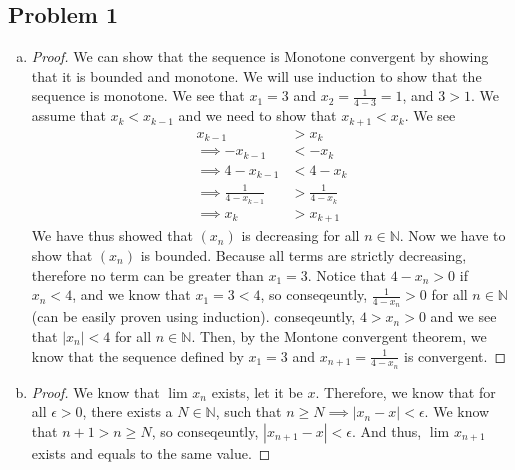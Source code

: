\documentclass[12pt]{article}
\begin{document}
\subsection*{Problem 1}
\begin{enumerate}[a).]
    \item {
        \begin{proof}
        We can show that the sequence is Monotone convergent by showing that it is bounded and monotone.
        We will use induction to show that the sequence is monotone. 
        We see that $x_1 = 3$ and $x_2 = \frac{1}{4 - 3} = 1$, and $3 > 1$. 
        We assume that $x_k < x_{k-1}$ and we need to show that $x_{k+1} < x_{k}$. 
        We see 
        \begin{align*}
            x_{k-1} &> x_{k}\\
            \implies - x_{k-1} &< -x_{k}\\
            \implies4 - x_{k-1} &< 4 -x_{k}\\
            \implies \frac{1}{4 - x_{k-1}} &> \frac{1}{4 -x_{k}}\\
            \implies x_k &> x_{k+1}
        \end{align*}
        We have thus showed that $(x_n)$ is decreasing for all $n \in \mathbb{N}$. 
        Now we have to show that $(x_n)$ is bounded.
        Because all terms are strictly decreasing, therefore no term can be greater than $x_1 = 3$. 
        Notice that $4 - x_n > 0$ if $x_n < 4$, and we know that $x_1 = 3 < 4$, so conseqeuntly, $\frac{1}{4 - x_n} > 0$ for all $n \in \mathbb{N}$ (can be easily proven using induction). 
        conseqeuntly, $4 > x_n > 0$ and we see that $|x_n| < 4$ for all $n \in \mathbb{N}$. 
        Then, by the Montone convergent theorem, we know that the sequence defined by $x_1 = 3$ and $x_{n+1} = \frac{1}{4 - x_n}$ is convergent. 
        \end{proof}

    }
    \item {
        \begin{proof}
        We know that $\lim_{} x_n$ exists, let it be $x$. 
        Therefore, we know that for all $\epsilon > 0$, there exists a $N \in \mathbb{N}$, such that $ n \ge N \implies |x_n - x| < \epsilon$. 
        We know that $n+1 > n \ge N$, so conseqeuntly, $|x_{n+1} - x| < \epsilon$. 
        And thus, $\lim_{} x_{n+1}$ exists and equals to the same value.
        \end{proof}

}
\end{enumerate}
\end{document}
